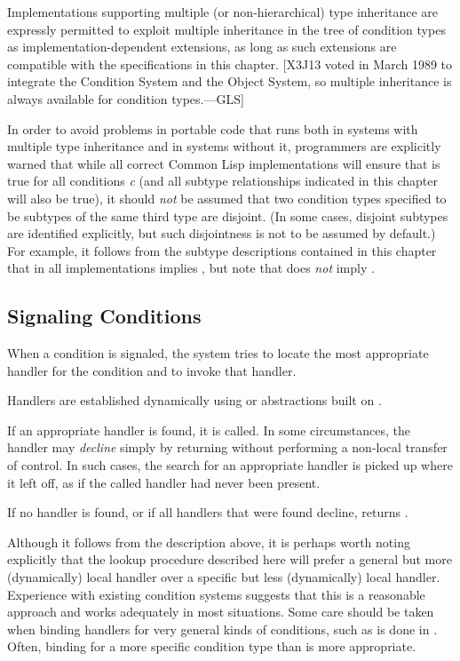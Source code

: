 Implementations supporting multiple (or non-hierarchical) type inheritance
are expressly permitted to exploit multiple inheritance in the tree of
condition types as implementation-dependent extensions, as long as such
extensions are compatible with the specifications in this chapter.
[X3J13 voted in March 1989 
to integrate the Condition System and the Object System,
so multiple inheritance is always available for condition types.---GLS]

In order to avoid problems in portable code that runs both in systems with
multiple type inheritance and in systems without it, programmers are explicitly
warned that while all correct Common Lisp implementations will ensure that
is true for all conditions \emph{c} (and all subtype relationships indicated in this
chapter will also be true), it should \emph{not} be assumed that two condition
types specified to be subtypes of the same third type are disjoint.
(In some cases,
disjoint subtypes are identified explicitly, but such disjointness is not to be assumed by
default.)  For example, it follows from the subtype descriptions contained in
this chapter that in all implementations
 implies ,
but note that
 does \emph{not}
imply .


\subsection{Signaling Conditions}

When a condition is signaled, the system tries to locate the most appropriate
handler for the condition and to invoke that handler.

Handlers are established dynamically using  or abstractions built
on .

If an appropriate handler is found, it is called. In some circumstances, 
the handler may \emph{decline} simply by returning without performing a 
non-local transfer of control. In such cases, the search for an 
appropriate handler is picked up where it left off, as if the called 
handler had never been present.

If no handler is found, or if all handlers that were found decline,
 returns .

Although it follows from the description above, it is perhaps worth noting
explicitly that the lookup procedure described here will prefer a general 
but more (dynamically) local handler over a specific but less (dynamically)
local handler. Experience with existing condition systems suggests that
this is a reasonable approach and works adequately in most situations. 
Some care should be taken when binding handlers for very general kinds of
conditions, such as is done in . Often, binding for a more
specific condition type than  is more appropriate.


